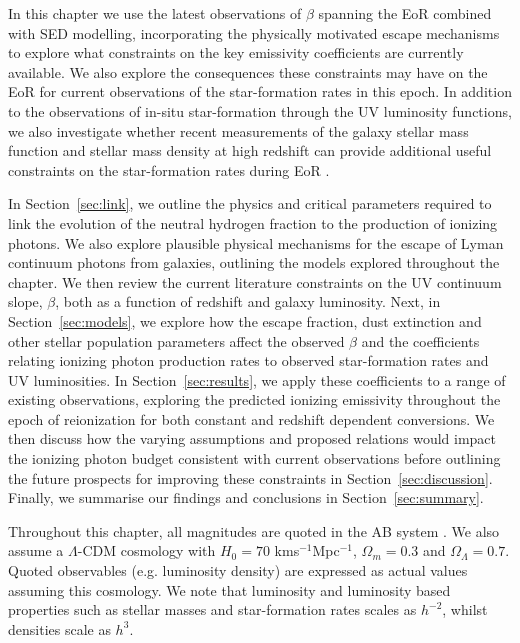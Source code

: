 In this chapter we use the latest observations of $\beta$ spanning the EoR combined with SED modelling, incorporating the physically motivated escape mechanisms to explore what constraints on the key emissivity coefficients are currently available. We also explore the consequences these constraints may have on the EoR for current observations of the star-formation rates in this epoch. In addition to the observations of in-situ star-formation through the UV luminosity functions, we also investigate whether recent measurements of the galaxy stellar mass function and stellar mass density at high redshift \citep{Duncan:2014gh,Grazian:2014vx} can provide additional useful constraints on the star-formation rates during EoR \citep{Stark:2007gi,Gonzalez:2010hm}.

In Section~\ref{sec:link}, we outline the physics and critical parameters required to link the evolution of the neutral hydrogen fraction to the production of ionizing photons. We also explore plausible physical mechanisms for the escape of Lyman continuum photons from galaxies, outlining the models explored throughout the chapter. We then review the current literature constraints on the UV continuum slope, $\beta$, both as a function of redshift and galaxy luminosity. Next, in Section~\ref{sec:models}, we explore how the escape fraction, dust extinction and other stellar population parameters affect the observed $\beta$ and the coefficients relating ionizing photon production rates to observed star-formation rates and UV luminosities. In Section~\ref{sec:results}, we apply these coefficients to a range of existing observations, exploring the predicted ionizing emissivity throughout the epoch of reionization for both constant and redshift dependent conversions. We then discuss how the varying assumptions and proposed relations would impact the ionizing photon budget consistent with current observations before outlining the future prospects for improving these constraints in Section~\ref{sec:discussion}. Finally, we summarise our findings and conclusions in Section~\ref{sec:summary}.

Throughout this chapter, all magnitudes are quoted in the AB system \citep{1983ApJ...266..713O}. We also assume a $\Lambda$-CDM cosmology with $H_{0} = 70$ kms$^{-1}$Mpc$^{-1}$, $\Omega_{m}=0.3$ and $\Omega_{\Lambda}=0.7$. Quoted observables (e.g. luminosity density) are expressed as actual values assuming this cosmology. We note that luminosity and luminosity based properties such as stellar masses and star-formation rates scales as $h^{-2}$, whilst densities scale as $h^{3}$.

